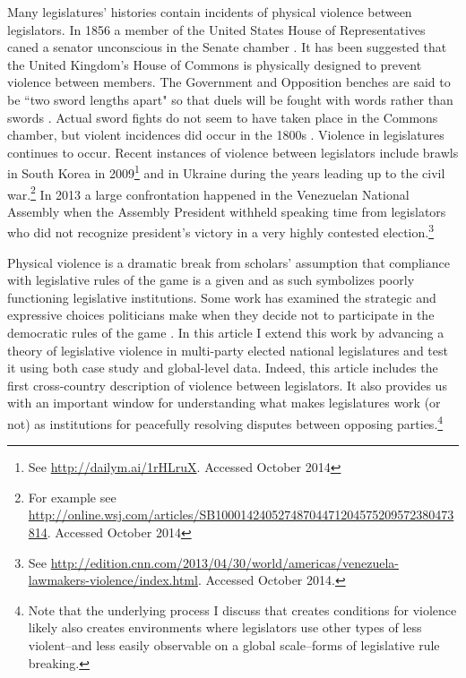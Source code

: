 \documentclass[a4paper]{article}\usepackage[]{graphicx}\usepackage[]{color}
\begin{document}
Many legislatures' histories contain incidents of physical violence between legislators. In 1856 a member of the United States House of Representatives caned a senator unconscious in the Senate chamber \citep{USSenateCanning}. It has been suggested that the United Kingdom's House of Commons is physically designed to prevent violence between members. The Government and Opposition benches are said to be ``two sword lengths apart" \citep{ParliamentUKSword} so that duels will be fought with words rather than swords \cite[220]{Schwarzmantel2010}. Actual sword fights do not seem to have taken place in the Commons chamber, but violent incidences did occur in the 1800s \citep[]{ByrneViolence}. Violence in legislatures continues to occur. Recent instances of violence between legislators include brawls in South Korea in 2009\footnote{See \url{http://dailym.ai/1rHLruX}. Accessed October 2014} and in Ukraine during the years leading up to the civil war.\footnote{For example see \url{http://online.wsj.com/articles/SB10001424052748704471204575209572380473814}. Accessed October 2014} In 2013 a large confrontation happened in the Venezuelan National Assembly when the Assembly President withheld speaking time from legislators who did not recognize president's victory in a very highly contested election.\footnote{See \url{http://edition.cnn.com/2013/04/30/world/americas/venezuela-lawmakers-violence/index.html}. Accessed October 2014.}

Physical violence is a dramatic break from scholars' assumption that compliance with legislative rules of the game is a given and as such symbolizes poorly functioning legislative institutions. Some work has examined the strategic and expressive choices politicians make when they decide not to participate in the democratic rules of the game \citep{wilkinson2006,Beaulieu2008,BeaulieuForthcoming}. In this article I extend this work by advancing a theory of legislative violence in multi-party elected national legislatures and test it using both case study and global-level data. Indeed, this article includes the first cross-country description of violence between legislators. It also provides us with an important window for understanding what makes legislatures work (or not) as institutions for peacefully resolving disputes between opposing parties.\footnote{Note that the underlying process I discuss that creates conditions for violence likely also creates environments where legislators use other types of less violent--and less easily observable on a global scale--forms of legislative rule breaking.}
\end{document}
